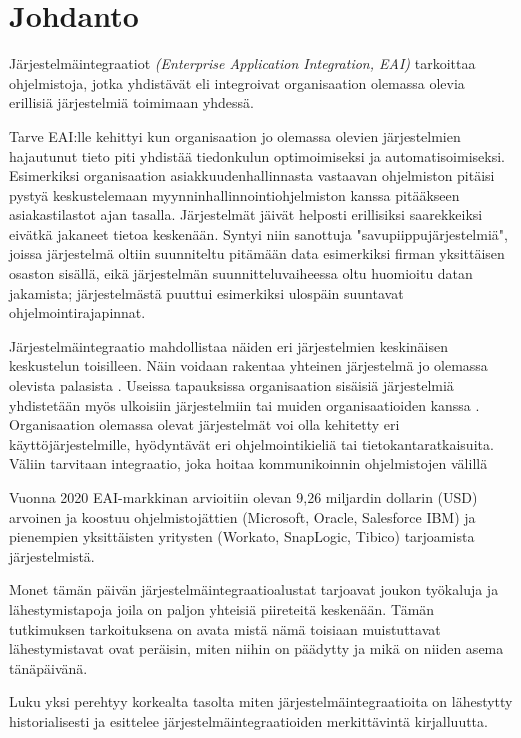 
\chapter{Johdanto}


Järjestelmäintegraatiot \textit{(Enterprise Application Integration, EAI)} tarkoittaa ohjelmistoja, 
jotka yhdistävät eli integroivat organisaation olemassa olevia erillisiä järjestelmiä toimimaan yhdessä.

Tarve EAI:lle kehittyi kun organisaation jo olemassa olevien
järjestelmien hajautunut tieto piti yhdistää tiedonkulun optimoimiseksi ja
automatisoimiseksi. Esimerkiksi organisaation asiakkuudenhallinnasta vastaavan ohjelmiston
pitäisi pystyä keskustelemaan myynninhallinnointiohjelmiston kanssa pitääkseen
asiakastilastot ajan tasalla. 
Järjestelmät jäivät helposti erillisiksi saarekkeiksi eivätkä jakaneet tietoa keskenään. 
Syntyi niin sanottuja "savupiippujärjestelmiä", joissa järjestelmä oltiin suunniteltu pitämään data esimerkiksi firman yksittäisen osaston sisällä, eikä järjestelmän suunnitteluvaiheessa oltu huomioitu datan jakamista; järjestelmästä puuttui esimerkiksi ulospäin suuntavat ohjelmointirajapinnat. 

Järjestelmäintegraatio mahdollistaa näiden eri järjestelmien keskinäisen keskustelun toisilleen. Näin voidaan rakentaa yhteinen järjestelmä jo olemassa olevista palasista \citep[sivu 15]{linthicum2000enterprise}. Useissa tapauksissa organisaation sisäisiä järjestelmiä yhdistetään myös ulkoisiin järjestelmiin tai muiden organisaatioiden kanssa \citep{Johannesson2001}.
Organisaation olemassa olevat järjestelmät voi olla kehitetty eri käyttöjärjestelmille, hyödyntävät eri
ohjelmointikieliä tai tietokantaratkaisuita. Väliin tarvitaan integraatio, joka hoitaa
kommunikoinnin ohjelmistojen välillä


Vuonna 2020 EAI-markkinan arvioitiin olevan 9,26 miljardin dollarin (USD) arvoinen \citep{mordorintelligence} ja koostuu ohjelmistojättien (Microsoft, Oracle, Salesforce IBM) ja pienempien yksittäisten yritysten (Workato, SnapLogic, Tibico) tarjoamista järjestelmistä.

Monet tämän päivän järjestelmäintegraatioalustat tarjoavat joukon työkaluja ja lähestymistapoja joila on paljon yhteisiä piireteitä keskenään. Tämän tutkimuksen tarkoituksena on avata mistä nämä toisiaan muistuttavat lähestymistavat ovat peräisin, miten niihin on päädytty ja mikä on niiden asema tänäpäivänä.

Luku yksi perehtyy korkealta tasolta miten järjestelmäintegraatioita on lähestytty historialisesti ja esittelee järjestelmäintegraatioiden merkittävintä kirjalluutta.

